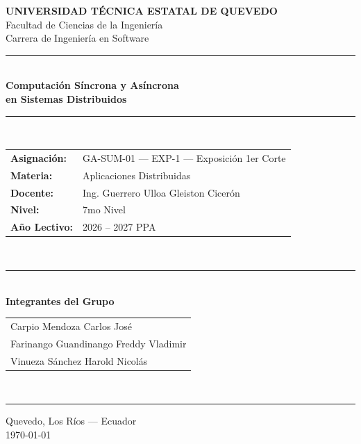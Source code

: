 \documentclass[12pt,a4paper]{article}
\begin{document}
 
\begin{titlepage}
  \centering
  \vspace*{0.2cm}
 
  {\large\bfseries UNIVERSIDAD TÉCNICA ESTATAL DE QUEVEDO}\\[0.1cm]
  {\normalsize Facultad de Ciencias de la Ingeniería}\\[0.1cm]
  {\normalsize Carrera de Ingeniería en Software}\\[0.4cm]
 
  \rule{\textwidth}{1.5pt}\\[0.2cm]
  {\LARGE\bfseries Computación Síncrona y Asíncrona\\[0.05cm]
  en Sistemas Distribuidos}\\[0.2cm]
  \rule{\textwidth}{1.5pt}\\[0.4cm]
 
  \begin{tabular}{@{}p{3.5cm}p{9cm}@{}}
    \textbf{Asignación:}  & GA-SUM-01 --- EXP-1 --- Exposición 1er Corte \\[0.25cm]
    \textbf{Materia:}     & Aplicaciones Distribuidas \\[0.25cm]
    \textbf{Docente:}     & Ing. Guerrero Ulloa Gleiston Cicerón \\[0.25cm]
    \textbf{Nivel:}       & 7mo Nivel \\[0.25cm]
    \textbf{Año Lectivo:} & 2026 -- 2027 PPA \\
  \end{tabular}\\[0.5cm]
 
  \rule{0.65\textwidth}{0.4pt}\\[0.35cm]
  {\normalsize\bfseries Integrantes del Grupo}\\[0.3cm]
  \begin{tabular}{l}
    Carpio Mendoza Carlos José \\[0.1cm]
    Farinango Guandinango Freddy Vladimir \\[0.1cm]
    Vinueza Sánchez Harold Nicolás \\
  \end{tabular}\\[0.4cm]
 
  \rule{0.65\textwidth}{0.4pt}
 
  \vfill
  {\normalsize Quevedo, Los Ríos --- Ecuador}\\[0.05cm]
  {\normalsize \today}
\end{titlepage}
 
\tableofcontents
\newpage
 
\end{document}
